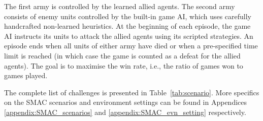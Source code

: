 \documentclass[twoside,11pt]{article}
\begin{document}
The first army is controlled by the learned allied agents.
The second army consists of enemy units controlled by the built-in game AI, which uses carefully handcrafted non-learned heuristics.
At the beginning of each episode, the game AI instructs its units to attack the allied agents using its scripted strategies.
An episode ends when all units of either army have died or when a pre-specified time limit is reached (in which case the game is counted as a defeat for the allied agents).
The goal is to maximise the win rate, i.e., the ratio of games won to games played.

The complete list of challenges is presented in Table~\ref{tab:scenario}. More specifics on the SMAC scenarios and environment settings can be found in Appendices \ref{appendix:SMAC_scenarios} and \ref{appendix:SMAC_evn_setting} respectively.

\begin{table*}
	\caption{SMAC challenges. Note that list of SMAC scenarios has been updated from the earlier version. All scenarios, however, are still available in the repository.}
	\label{tab:scenario}
\end{table*}
\end{document}
